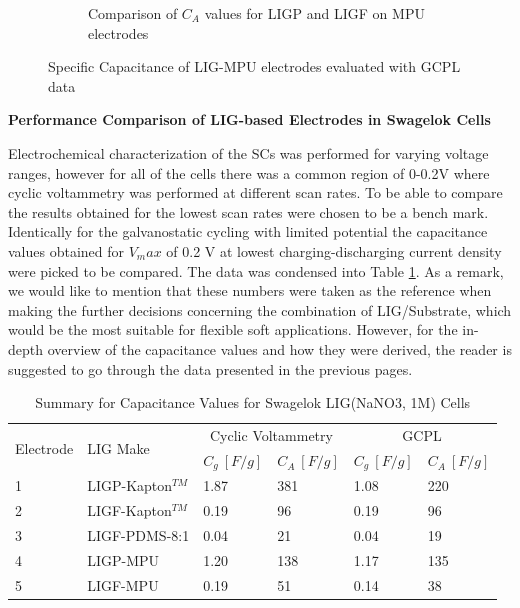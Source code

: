 \begin{figure}[H]
\begin{subfigure}{0.49\textwidth}
\captionsetup{width=0.9\linewidth}
\caption{Comparison of $C_A$ values for LIGP and LIGF on MPU electrodes}
\label{fig:LIGs-MPU-C-A}
\end{subfigure}
\medskip
\caption{Specific Capacitance of LIG-MPU electrodes evaluated with GCPL data}
\label{fig:LIGs-MPU-C-Comparison}
\end{figure}


\textbf{Performance Comparison of LIG-based Electrodes in Swagelok Cells}

Electrochemical characterization of the SCs was performed for varying voltage ranges, however for all of the cells there was a common region of 0-0.2\:V where cyclic voltammetry was performed at different scan rates. To be able to compare the results obtained for the lowest scan rates were chosen to be a bench mark. Identically for the galvanostatic cycling with limited potential the capacitance values obtained for $V_max$ of 0.2 V at lowest charging-discharging current density were picked to be compared. The data was condensed into Table \ref{tab:swagelok-comparison}. As a remark, we would like to mention that these numbers were taken as the reference when making the further decisions concerning the combination of LIG/Substrate, which would be the most suitable for flexible soft applications. However, for the in-depth overview of the capacitance values and how they were derived, the reader is suggested to go through the data presented in the previous pages.

\begin{table}[H]
\centering
    \caption{Summary for Capacitance Values for Swagelok LIG(NaNO3, 1M) Cells}
    \label{tab:swagelok-comparison} 
\medskip
\medskip
\begin{tabular}{ l | l | l | l || l| l  } 
\hline
\multirow{2}{*}{Electrode}& \multirow{2}{*}{LIG Make} &
\multicolumn{2}{c||}{Cyclic Voltammetry} &
\multicolumn{2}{c}{GCPL} \\[13px]


	Type $\#$ &  & $C_g\:[F/g]$ & $C_A\:[F/g]$ & $C_g\:[F/g]$ & $C_A\:[F/g]$ \\ [13px]\hline
	
	1  & LIGP-Kapton$^{TM}$ & 1.87& 381 & 1.08  & 220 \\ [13px]
	
	2  & LIGF-Kapton$^{TM}$ & 0.19& 96 & 0.19 & 96 \\ [13px]
	
	3  & LIGF-PDMS-8:1 &0.04  & 21 & 0.04 & 19\\ [13px]
	
	4  & LIGP-MPU &1.20  & 138 & 1.17  & 135\\ [13px]
	
	5  & LIGF-MPU &0.19  & 51 & 0.14 & 38\\ [13px]
	
\end{tabular}
\end{table}


